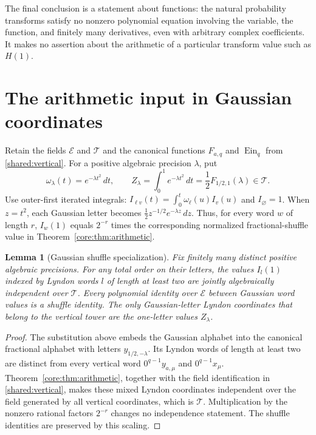 \documentclass[11pt,a4paper]{article}
\newcommand{\E}{\mathcal E}
\newcommand{\T}{\mathcal T}
\DeclareMathOperator{\Ein}{Ein}
\newtheorem{lemma}[theorem]{Lemma}
\theoremstyle{definition}
\theoremstyle{remark}
\numberwithin{equation}{section}
\begin{document}
The final conclusion is a statement about functions: the natural
probability transforms satisfy no nonzero polynomial equation involving
the variable, the function, and finitely many derivatives, even with
arbitrary complex coefficients. It makes no assertion about the
arithmetic of a particular transform value such as $H(1)$.

\section{The arithmetic input in Gaussian coordinates}
Retain the fields $\E$ and $\T$ and the canonical functions
$F_{a,q}$ and $\Ein_q$ from \ref{shared:vertical}.
For a positive algebraic precision $\lambda$, put
\[
 \omega_\lambda(t)=e^{-\lambda t^2}\,dt,\qquad
 Z_\lambda=\int_0^1e^{-\lambda t^2}\,dt
       =\frac12F_{1/2,1}(\lambda)\in\T.
\]
Use outer-first iterated integrals: $I_{\ell v}(t)=
\int_0^t\omega_\ell(u)I_v(u)$ and $I_\varnothing=1$.
When $z=t^2$, each Gaussian letter becomes
$\frac12z^{-1/2}e^{-\lambda z}\,dz$. Thus, for every word $w$ of
length $r$, $I_w(1)$ equals $2^{-r}$ times the corresponding normalized
fractional-shuffle value in Theorem~\ref{core:thm:arithmetic}.

\begin{lemma}[Gaussian shuffle specialization]\label{rank:lem:input}
Fix finitely many distinct positive algebraic precisions. For any total
order on their letters, the values $I_l(1)$ indexed by Lyndon words
$l$ of length at least two are jointly algebraically independent over
$\T$. Every polynomial identity over $\E$ between Gaussian word
values is a shuffle identity. The only Gaussian-letter Lyndon
coordinates that belong to the vertical tower are the
one-letter values $Z_\lambda$.
\end{lemma}
\begin{proof}
The substitution above embeds the Gaussian alphabet into the canonical
fractional alphabet with letters $y_{1/2,-\lambda}$. Its Lyndon words
of length at least two are distinct from every vertical word
$0^{q-1}y_{a,\mu}$ and $0^{q-1}x_\mu$. Theorem~\ref{core:thm:arithmetic}, together with the field
identification in \ref{shared:vertical}, makes these mixed Lyndon
coordinates independent over the field generated by all vertical
coordinates, which is $\T$. Multiplication
by the nonzero rational factors $2^{-r}$ changes no independence
statement. The shuffle identities are preserved by this scaling.
\end{proof}
\end{document}
